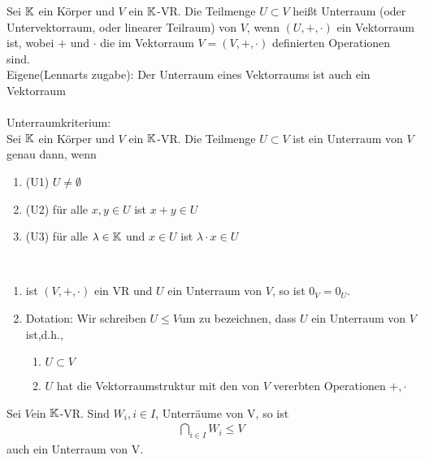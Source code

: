 \begin{definition}
    Sei $\mathbb{K}$ ein Körper und $V$ ein $\mathbb{K}$-VR. Die Teilmenge $U\subset V$ heißt Unterraum (oder Untervektorraum, oder linearer Teilraum) von $V $, wenn $(U,+,\cdot) $ ein Vektorraum ist, wobei $+$ und $\cdot$ die im Vektorraum $V=(V,+,\cdot)$ definierten Operationen sind.\\
    Eigene(Lennarts zugabe): Der Unterraum eines Vektorraums ist auch ein Vektorraum\\
    \\
    Unterraumkriterium:\\
    Sei $\mathbb{K}$ ein Körper und $V$ ein $\mathbb{K}$-VR. Die Teilmenge $U\subset V $ ist ein Unterraum von $V$ genau dann, wenn
    \begin{enumerate}
        \item (U1) $U\neq \emptyset$
        \item (U2) für alle $x,y\in U$ ist $x+y\in U$
        \item (U3) für alle $\lambda \in \mathbb{K}$ und $x\in U$ ist $\lambda\cdot x \in U$
    \end{enumerate}
\end{definition}
\newpage
\begin{remark}
\quad \\
    \begin{enumerate}
        \item ist $(V,+,\cdot)$ ein VR und $U$ ein Unterraum von $V$, so  ist $0_V=0_U$.
        \item Dotation: Wir schreiben $U\leq V$um zu bezeichnen, dass $U$ ein Unterraum von $V$ ist,d.h.,
        \begin{enumerate}
            \item $U\subset V$
            \item $U$ hat die Vektorraumstruktur mit den von $V$ vererbten Operationen $+,\cdot$
        \end{enumerate}
    \end{enumerate}
\end{remark}

\begin{proposition}
Sei $V $ein $\mathbb{K}$-VR. Sind $W_i, i\in I$, Unterräume von V, so ist 
\begin{align*}
    \bigcap_{i\in I} W_i \leq V
\end{align*}
auch ein Unterraum von V.
\end{proposition}


